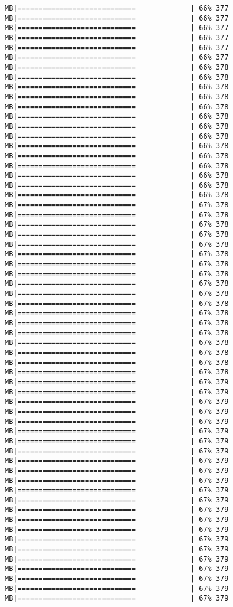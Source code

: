\documentclass[
]{article}
\begin{document}
\begin{verbatim}
MB|============================             | 66% 377 MB|============================             | 66% 377 MB|============================             | 66% 377 MB|============================             | 66% 377 MB|============================             | 66% 377 MB|============================             | 66% 377 MB|============================             | 66% 378 MB|============================             | 66% 378 MB|============================             | 66% 378 MB|============================             | 66% 378 MB|============================             | 66% 378 MB|============================             | 66% 378 MB|============================             | 66% 378 MB|============================             | 66% 378 MB|============================             | 66% 378 MB|============================             | 66% 378 MB|============================             | 66% 378 MB|============================             | 66% 378 MB|============================             | 66% 378 MB|============================             | 66% 378 MB|============================             | 67% 378 MB|============================             | 67% 378 MB|============================             | 67% 378 MB|============================             | 67% 378 MB|============================             | 67% 378 MB|============================             | 67% 378 MB|============================             | 67% 378 MB|============================             | 67% 378 MB|============================             | 67% 378 MB|============================             | 67% 378 MB|============================             | 67% 378 MB|============================             | 67% 378 MB|============================             | 67% 378 MB|============================             | 67% 378 MB|============================             | 67% 378 MB|============================             | 67% 378 MB|============================             | 67% 378 MB|============================             | 67% 378 MB|============================             | 67% 379 MB|============================             | 67% 379 MB|============================             | 67% 379 MB|============================             | 67% 379 MB|============================             | 67% 379 MB|============================             | 67% 379 MB|============================             | 67% 379 MB|============================             | 67% 379 MB|============================             | 67% 379 MB|============================             | 67% 379 MB|============================             | 67% 379 MB|============================             | 67% 379 MB|============================             | 67% 379 MB|============================             | 67% 379 MB|============================             | 67% 379 MB|============================             | 67% 379 MB|============================             | 67% 379 MB|============================             | 67% 379 MB|============================             | 67% 379 MB|============================             | 67% 379 MB|============================             | 67% 379 MB|============================             | 67% 379 MB|============================             | 67% 379 
\end{verbatim}
\end{document}
